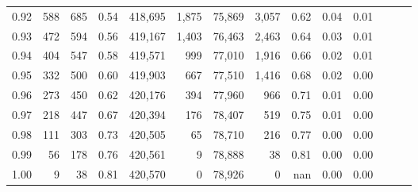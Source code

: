 \begin{tabular}{rrrrrrrrrrrrrr}
0.92 &    588 &    685 &  0.54 &  418,695 &    1,875 &  75,869 &   3,057 &  0.62 &  0.04 &      0.01 \\
0.93 &    472 &    594 &  0.56 &  419,167 &    1,403 &  76,463 &   2,463 &  0.64 &  0.03 &      0.01 \\
0.94 &    404 &    547 &  0.58 &  419,571 &      999 &  77,010 &   1,916 &  0.66 &  0.02 &      0.01 \\
0.95 &    332 &    500 &  0.60 &  419,903 &      667 &  77,510 &   1,416 &  0.68 &  0.02 &      0.00 \\
0.96 &    273 &    450 &  0.62 &  420,176 &      394 &  77,960 &     966 &  0.71 &  0.01 &      0.00 \\
0.97 &    218 &    447 &  0.67 &  420,394 &      176 &  78,407 &     519 &  0.75 &  0.01 &      0.00 \\
0.98 &    111 &    303 &  0.73 &  420,505 &       65 &  78,710 &     216 &  0.77 &  0.00 &      0.00 \\
0.99 &     56 &    178 &  0.76 &  420,561 &        9 &  78,888 &      38 &  0.81 &  0.00 &      0.00 \\
1.00 &      9 &     38 &  0.81 &  420,570 &        0 &  78,926 &       0 &   nan &  0.00 &      0.00 \\
\bottomrule
\end{tabular}
